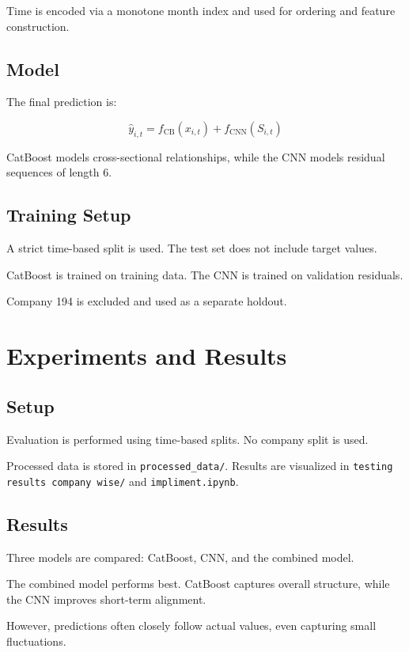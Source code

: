 \documentclass[11pt]{article}
\begin{document}
Time is encoded via a monotone month index and used for ordering and feature construction.

\subsection{Model}

The final prediction is:

\[
\hat{y}_{i,t} = f_{\text{CB}}(x_{i,t}) + f_{\text{CNN}}(S_{i,t})
\]

CatBoost models cross-sectional relationships, while the CNN models residual sequences of length 6.

\subsection{Training Setup}

A strict time-based split is used. The test set does not include target values.

CatBoost is trained on training data. The CNN is trained on validation residuals.

Company 194 is excluded and used as a separate holdout.

\section{Experiments and Results}

\subsection{Setup}

Evaluation is performed using time-based splits. No company split is used.

Processed data is stored in \texttt{processed\_data/}. Results are visualized in
\texttt{testing results company wise/} and \texttt{impliment.ipynb}.

\subsection{Results}

Three models are compared: CatBoost, CNN, and the combined model.

The combined model performs best. CatBoost captures overall structure, while the CNN improves short-term alignment.

However, predictions often closely follow actual values, even capturing small fluctuations.
\end{document}
